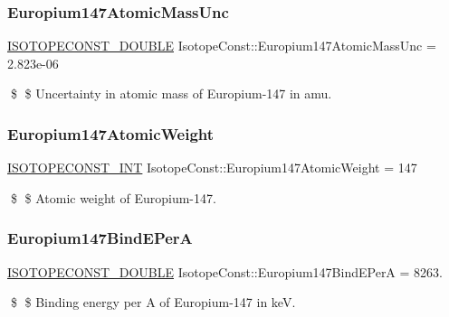\subsubsection{\texorpdfstring{Europium147\+Atomic\+Mass\+Unc}{Europium147AtomicMassUnc}}
{\footnotesize\ttfamily \mbox{\hyperlink{group___isotope_const-_macros_ga8f45a7272ce02c0b4c65c44636ed719a}{I\+S\+O\+T\+O\+P\+E\+C\+O\+N\+S\+T\+\_\+\+D\+O\+U\+B\+LE}} Isotope\+Const\+::\+Europium147\+Atomic\+Mass\+Unc = 2.\+823e-\/06}

\$ \$ Uncertainty in atomic mass of Europium-\/147 in amu. \mbox{\label{group___isotope_const-_europium-_eu147_ga18f596568d0e28a3f03862ced05f070b}} 
\subsubsection{\texorpdfstring{Europium147\+Atomic\+Weight}{Europium147AtomicWeight}}
{\footnotesize\ttfamily \mbox{\hyperlink{group___isotope_const-_macros_ga5f18360b3e99483a35c32d789e62621c}{I\+S\+O\+T\+O\+P\+E\+C\+O\+N\+S\+T\+\_\+\+I\+NT}} Isotope\+Const\+::\+Europium147\+Atomic\+Weight = 147}

\$ \$ Atomic weight of Europium-\/147. \mbox{\label{group___isotope_const-_europium-_eu147_gad8c4f0b98640439b645f2a1c2dd381a6}} 
\subsubsection{\texorpdfstring{Europium147\+Bind\+E\+PerA}{Europium147BindEPerA}}
{\footnotesize\ttfamily \mbox{\hyperlink{group___isotope_const-_macros_ga8f45a7272ce02c0b4c65c44636ed719a}{I\+S\+O\+T\+O\+P\+E\+C\+O\+N\+S\+T\+\_\+\+D\+O\+U\+B\+LE}} Isotope\+Const\+::\+Europium147\+Bind\+E\+PerA = 8263.}

\$ \$ Binding energy per A of Europium-\/147 in keV. \mbox{\label{group___isotope_const-_europium-_eu147_ga898cb503a6b878fe2911a5c993eccbb3}} 
